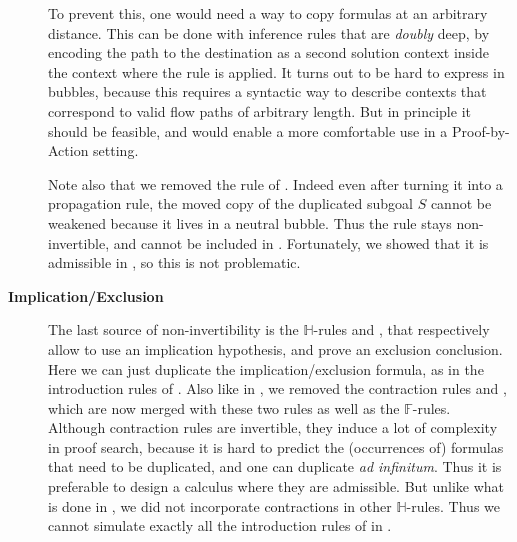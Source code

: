 \begin{description}
    To prevent this, one would need a way to copy formulas at an arbitrary
    distance. This can be done with inference rules that are \emph{doubly} deep,
    by encoding the path to the destination as a second solution context inside
    the context where the rule is applied. It turns out
    to be hard to express in bubbles, because this requires a syntactic way to
    describe contexts that correspond to valid flow paths of arbitrary
    length. But in
    principle it should be feasible, and would enable a more comfortable use in
    a Proof-by-Action setting.

    Note also that we removed the  rule of .
    Indeed even after turning it into a propagation rule, the moved copy of the
    duplicated subgoal $S$ cannot be weakened because it lives in a neutral
    bubble. Thus the rule stays non-invertible, and cannot be included in
    . Fortunately, we showed that it is admissible in
    , so this is not problematic.

  \item[\textbf{Implication/Exclusion}]
    The last source of non-invertibility is the $\mathbb{H}$-rules
    \rsf{{\limp}{-}} and \rsf{{\lsub}{+}}, that respectively allow to use an
    implication hypothesis, and prove an exclusion conclusion.
    Here we can just duplicate the implication/exclusion formula, as in the
    introduction rules of . Also like in , we removed
    the contraction rules  and , which are now merged with
    these two rules as well as the $\mathbb{F}$-rules. Although contraction
    rules are invertible, they induce a lot of complexity in proof search,
    because it is hard to predict the (occurrences of) formulas that need to be
    duplicated, and one can duplicate \emph{ad infinitum}. Thus it is preferable
    to design a calculus where they are admissible. But unlike what is done in
    , we did not incorporate contractions in other
    $\mathbb{H}$-rules. Thus we cannot simulate exactly all the introduction
    rules of  in .

\end{description}


